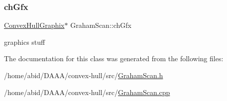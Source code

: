 \subsubsection{\texorpdfstring{chGfx}{chGfx}}
{\footnotesize\ttfamily \mbox{\hyperlink{class_convex_hull_graphix}{Convex\+Hull\+Graphix}}$\ast$ Graham\+Scan\+::ch\+Gfx}

graphics stuff 

The documentation for this class was generated from the following files\+:\begin{DoxyCompactItemize}
\item 
/home/abid/\+D\+A\+A\+A/convex-\/hull/src/\mbox{\hyperlink{_graham_scan_8h}{Graham\+Scan.\+h}}\item 
/home/abid/\+D\+A\+A\+A/convex-\/hull/src/\mbox{\hyperlink{_graham_scan_8cpp}{Graham\+Scan.\+cpp}}\end{DoxyCompactItemize}
